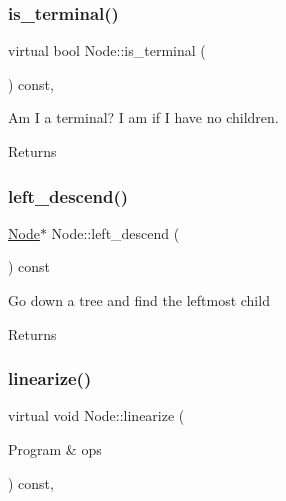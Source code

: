 \subsubsection{\texorpdfstring{is\+\_\+terminal()}{is\_terminal()}}
{\footnotesize\ttfamily virtual bool Node\+::is\+\_\+terminal (\begin{DoxyParamCaption}{ }\end{DoxyParamCaption}) const\hspace{0.3cm}{\ttfamily [inline]}, {\ttfamily [virtual]}}

Am I a terminal? I am if I have no children. \begin{DoxyReturn}{Returns}

\end{DoxyReturn}
\mbox{\label{class_node_ac6d1a1d71a28168b34e9092568570738}} 
\subsubsection{\texorpdfstring{left\+\_\+descend()}{left\_descend()}}
{\footnotesize\ttfamily \hyperlink{class_node}{Node}$\ast$ Node\+::left\+\_\+descend (\begin{DoxyParamCaption}{ }\end{DoxyParamCaption}) const\hspace{0.3cm}{\ttfamily [inline]}}

Go down a tree and find the leftmost child \begin{DoxyReturn}{Returns}

\end{DoxyReturn}
\mbox{\label{class_node_ac995508e96e112675fde53e7748e41bc}} 
\subsubsection{\texorpdfstring{linearize()}{linearize()}}
{\footnotesize\ttfamily virtual void Node\+::linearize (\begin{DoxyParamCaption}\item[{Program \&}]{ops }\end{DoxyParamCaption}) const\hspace{0.3cm}{\ttfamily [inline]}, {\ttfamily [virtual]}}

